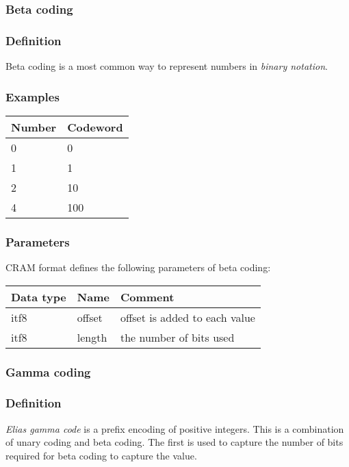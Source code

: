 \documentclass[a4paper]{article}
\begin{document}
\subsubsection*{Beta coding}

\subsubsection*{Definition}

Beta coding is a most common way to represent numbers in \emph{binary notation}. 


\subsubsection*{Examples}

\begin{tabular}{|>{\raggedright}p{222pt}|>{\raggedright}p{222pt}|}
\hline
\textbf{Number} & \textbf{Codeword}\tabularnewline
\hline
0 & 0\tabularnewline
\hline
1 & 1\tabularnewline
\hline
2 & 10\tabularnewline
\hline
4 & 100\tabularnewline
\hline
\end{tabular}

\subsubsection*{Parameters}

CRAM format defines the following parameters of beta coding: 

\begin{tabular}{|>{\raggedright}p{144pt}|>{\raggedright}p{144pt}|>{\raggedright}p{144pt}|}
\hline
\textbf{Data type} & \textbf{Name} & \textbf{Comment}\tabularnewline
\hline
itf8 & offset & offset is added to each value\tabularnewline
\hline
itf8 & length & the number of bits used\tabularnewline
\hline
\end{tabular}

\subsubsection*{Gamma coding}

\subsubsection*{Definition}

\emph{Elias gamma code} is a prefix encoding of positive integers. This is a combination 
of unary coding and beta coding. The first is used to capture the number of bits 
required for beta coding to capture the value. 
\end{document}
